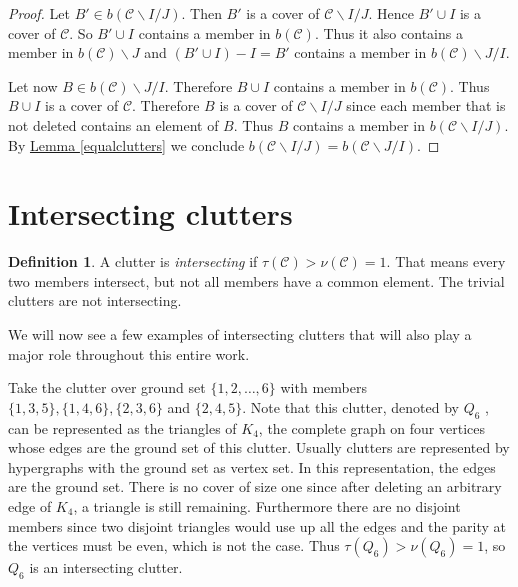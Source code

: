 \documentclass[a4paper, 12pt, twoside=false]{scrbook}
\theoremstyle{definition}
\newtheorem*{definition}{Definition}
\begin{document}
\begin{proof}
    Let $B' \in b(\mathcal{C}\backslash I /J)$. Then $B'$ is a cover of $\mathcal{C}\backslash I /J$.
    Hence $B' \cup I$ is a cover of $\mathcal{C}$.
    So $B' \cup I$ contains a member in $b(\mathcal{C})$. Thus it also contains a member in $b(\mathcal{C})\backslash J$ and $(B' \cup I)-I=B'$ contains a member in $b(\mathcal{C})\backslash J /I$.

    Let now $B \in b(\mathcal{C})\backslash J/I$. Therefore $B \cup I$ contains a member in $b(\mathcal{C})$. Thus $B \cup I$ is a cover of $\mathcal{C}$. Therefore $B$ is a cover of $\mathcal{C}\backslash I /J$ since each member that is not deleted contains an element of $B$. Thus $B$ contains a member in $b(\mathcal{C}\backslash I /J)$.
    By \hyperref[equalclutters]{Lemma \ref*{equalclutters}} we conclude $b(\mathcal{C}\backslash I /J) = b(\mathcal{C} \backslash J / I)$.

\end{proof}


\section{Intersecting clutters}
\begin{definition}
    A clutter is \emph{intersecting} if $\tau(\mathcal{C}) > \nu(\mathcal{C}) = 1$. That means every two members intersect, but not all members have a common element.
    The trivial clutters are not intersecting.
\end{definition}
We will now see a few examples of intersecting clutters that will also play a major role throughout this entire work.

Take the clutter over ground set $\{1,2,\ldots,6\}$ with members $\{1,3,5\}, \{1,4,6\}, \{2,3,6\}$ and $\{2,4,5\}$.
Note that this clutter, denoted by $Q_6$ \cite{q6}, can be represented as the triangles of $K_4$, the complete graph on four vertices whose edges are the ground set of this clutter. Usually clutters are represented by hypergraphs with the ground set as vertex set. In this representation, the edges are the ground set.
There is no cover of size one since after deleting an arbitrary edge of $K_4$, a triangle is still remaining.
Furthermore there are no disjoint members since two disjoint triangles would use up all the edges and the parity at the vertices must be even, which is not the case.
Thus $\tau(Q_6) > \nu(Q_6) = 1$, so $Q_6$ is an intersecting clutter.
\end{document}
